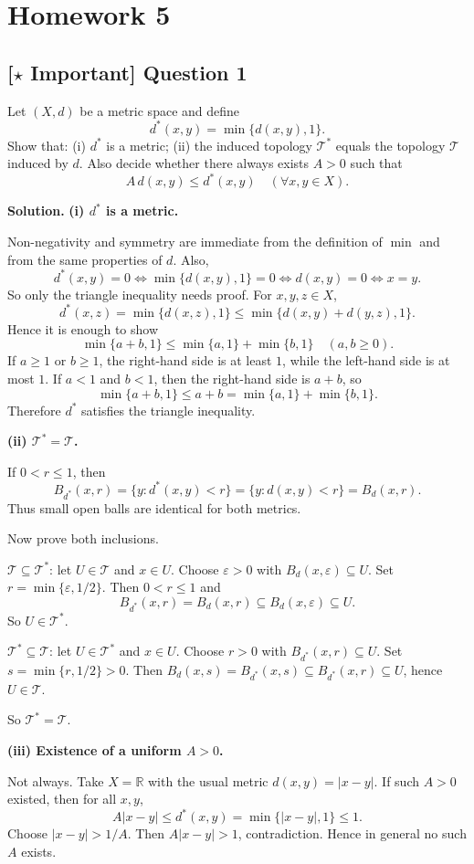 \documentclass{article}
\newcommand{\R}{\mathbb{R}}
\newcommand{\important}{\texorpdfstring{\textbf{[\(\star\) Important]}}{[Important]}}
\newenvironment{solution}{\par\noindent\textbf{Solution.}\quad}{\par}
\begin{document}
\section{Homework 5}



\subsection{\important{} Question 1}

Let $(X,d)$ be a metric space and define
\[
  d^*(x,y)=\min\{d(x,y),1\}.
\]
Show that: (i) $d^*$ is a metric; (ii) the induced topology $\mathcal{T}^*$
equals the topology $\mathcal{T}$ induced by $d$.
Also decide whether there always exists $A>0$ such that
\[
  A\,d(x,y)\le d^*(x,y)\quad (\forall x,y\in X).
\]

\begin{solution}
  \textbf{(i) $d^*$ is a metric.}

  Non-negativity and symmetry are immediate from the definition of
  $\min$ and from the same properties of $d$.
  Also,
  \[
    d^*(x,y)=0 \iff \min\{d(x,y),1\}=0 \iff d(x,y)=0 \iff x=y.
  \]
  So only the triangle inequality needs proof.
  For $x,y,z\in X$,
  \[
    d^*(x,z)=\min\{d(x,z),1\}\le \min\{d(x,y)+d(y,z),1\}.
  \]
  Hence it is enough to show
  \[
    \min\{a+b,1\}\le \min\{a,1\}+\min\{b,1\}\quad (a,b\ge 0).
  \]
  If $a\ge 1$ or $b\ge 1$, the right-hand side is at least $1$, while
  the left-hand side is at most $1$.
  If $a<1$ and $b<1$, then the right-hand side is $a+b$, so
  \[
    \min\{a+b,1\}\le a+b=\min\{a,1\}+\min\{b,1\}.
  \]
  Therefore $d^*$ satisfies the triangle inequality.

  \textbf{(ii) $\mathcal{T}^*=\mathcal{T}$.}

  If $0<r\le 1$, then
  \[
    B_{d^*}(x,r)=\{y: d^*(x,y)<r\}=\{y:d(x,y)<r\}=B_d(x,r).
  \]
  Thus small open balls are identical for both metrics.

  Now prove both inclusions.

  $\mathcal{T}\subseteq \mathcal{T}^*$: let $U\in \mathcal{T}$ and $x\in U$. Choose $\varepsilon>0$
  with $B_d(x,\varepsilon)\subseteq U$.
  Set $r=\min\{\varepsilon,1/2\}$.
  Then $0<r\le 1$ and
  \[
    B_{d^*}(x,r)=B_d(x,r)\subseteq B_d(x,\varepsilon)\subseteq U.
  \]
  So $U\in \mathcal{T}^*$.

  $\mathcal{T}^*\subseteq \mathcal{T}$: let $U\in \mathcal{T}^*$ and $x\in U$. Choose $r>0$ with
  $B_{d^*}(x,r)\subseteq U$.
  Set $s=\min\{r,1/2\}>0$.
  Then $B_d(x,s)=B_{d^*}(x,s)\subseteq B_{d^*}(x,r)\subseteq U$, hence $U\in \mathcal{T}$.

  So $\mathcal{T}^*=\mathcal{T}$.

  \textbf{(iii) Existence of a uniform $A>0$.}

  Not always.
  Take $X=\R$ with the usual metric $d(x,y)=|x-y|$. If such $A>0$
  existed, then for all $x,y$,
  \[
    A|x-y|\le d^*(x,y)=\min\{|x-y|,1\}\le 1.
  \]
  Choose $|x-y|>1/A$. Then $A|x-y|>1$, contradiction.
  Hence in general no such $A$ exists.
\end{solution}
\end{document}
